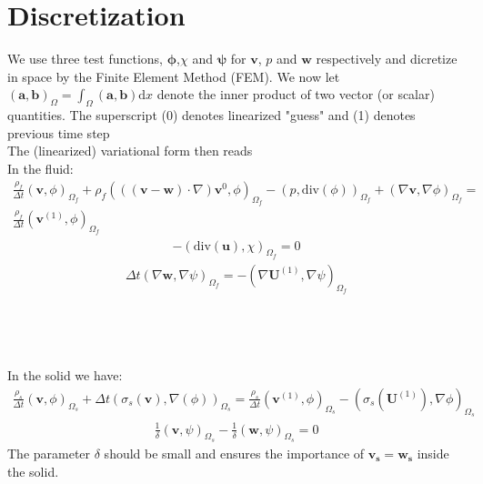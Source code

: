 \documentclass{article}
\begin{document}
\section{Discretization}
We use three test functions, $\mathbf{\phi}$,$\chi$ and $\mathbf{\psi}$ for $\mathbf{v}$, $p$ and $\mathbf{w}$ respectively and dicretize in space by the Finite Element Method (FEM). We now let $(\mathbf{a},\mathbf{b})_\Omega = \int_\Omega(\mathbf{a},\mathbf{b}) \mathrm{d}x $ denote the inner product of two vector (or scalar) quantities. The superscript (0) denotes linearized "guess" and (1) denotes previous time step\\
The (linearized) variational form then reads \\
In the fluid: 
\begin{align} 
\frac{\rho_f}{\Delta t}(\mathbf{v},\phi)_{\Omega_f} + \rho_f(((\mathbf{v}-\mathbf{w})\cdot \nabla) \mathbf{v}^{0}, \phi)_{\Omega_f} - (p,\text{div}(\phi))_{\Omega_f} + (\nabla \mathbf{v}, \nabla \phi)_{\Omega_f} = & \\
\frac{\rho_f}{\Delta t}(\mathbf{v}^{(1)},\phi)_{\Omega_f}
\end{align}
\begin{align}
-(\text{div}(\mathbf{u}),\chi)_{\Omega_f} = 0
\end{align}
\begin{align}
\Delta t(\nabla \mathbf{w}, \nabla \psi)_{\Omega_f} = - (\nabla \mathbf{U}^{(1)}, \nabla \psi)_{\Omega_f}
\end{align}
\\
\\
\\
\\
In the solid we have: 
\begin{align}
\frac{\rho_s}{\Delta t}(\mathbf{v},\phi)_{\Omega_s} + \Delta t (\sigma_s (\mathbf{v}), \nabla(\phi))_{\Omega_s} = \frac{\rho_s}{\Delta t}(\mathbf{v}^{(1)},\phi)_{\Omega_s} - (\sigma_s(\mathbf{U}^{(1)}), \nabla \phi)_{\Omega_s}
\end{align}
\begin{align}
\frac{1}{\delta}(\mathbf{v},\psi)_{\Omega_s} - \frac{1}{\delta}(\mathbf{w},\psi)_{\Omega_s} = 0
\end{align}
The parameter $\delta $ should be small and ensures the importance of $\mathbf{v_s} = \mathbf{w_s}$ inside the solid. 
\\
\end{document}

